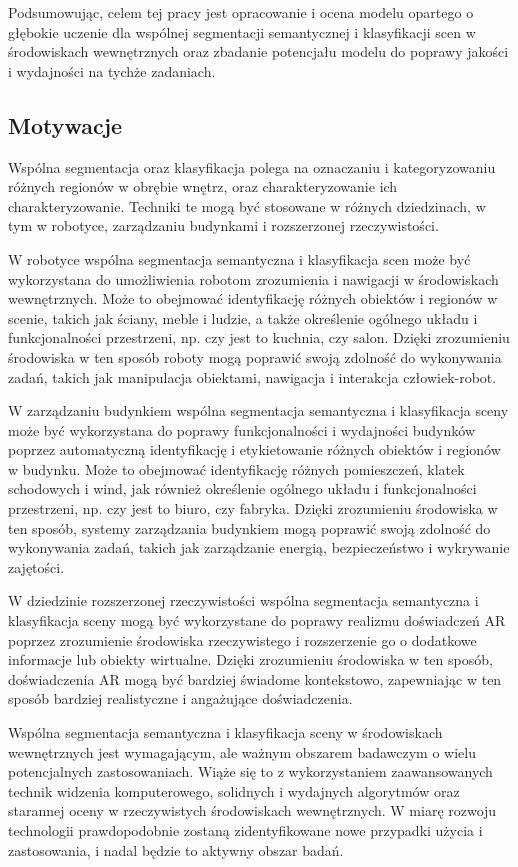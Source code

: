 Podsumowując, celem tej pracy jest opracowanie i ocena modelu opartego o głębokie uczenie dla wspólnej segmentacji semantycznej i klasyfikacji scen w środowiskach wewnętrznych oraz zbadanie potencjału modelu do poprawy jakości i wydajności na tychże zadaniach.

\subsection{Motywacje}
Wspólna segmentacja oraz klasyfikacja polega na oznaczaniu i kategoryzowaniu różnych regionów w obrębie wnętrz, oraz charakteryzowanie ich charakteryzowanie. Techniki te mogą być stosowane w różnych dziedzinach, w tym w robotyce, zarządzaniu budynkami i rozszerzonej rzeczywistości.

W robotyce wspólna segmentacja semantyczna i klasyfikacja scen może być wykorzystana do umożliwienia robotom zrozumienia i nawigacji w środowiskach wewnętrznych. Może to obejmować identyfikację różnych obiektów i regionów w scenie, takich jak ściany, meble i ludzie, a także określenie ogólnego układu i funkcjonalności przestrzeni, np. czy jest to kuchnia, czy salon. Dzięki zrozumieniu środowiska w ten sposób roboty mogą poprawić swoją zdolność do wykonywania zadań, takich jak manipulacja obiektami, nawigacja i interakcja człowiek-robot.

W zarządzaniu budynkiem wspólna segmentacja semantyczna i klasyfikacja sceny może być wykorzystana do poprawy funkcjonalności i wydajności budynków poprzez automatyczną identyfikację i etykietowanie różnych obiektów i regionów w budynku. Może to obejmować identyfikację różnych pomieszczeń, klatek schodowych i wind, jak również określenie ogólnego układu i funkcjonalności przestrzeni, np. czy jest to biuro, czy fabryka. Dzięki zrozumieniu środowiska w ten sposób, systemy zarządzania budynkiem mogą poprawić swoją zdolność do wykonywania zadań, takich jak zarządzanie energią, bezpieczeństwo i wykrywanie zajętości.

W dziedzinie rozszerzonej rzeczywistości wspólna segmentacja semantyczna i klasyfikacja sceny mogą być wykorzystane do poprawy realizmu doświadczeń AR poprzez zrozumienie środowiska rzeczywistego i rozszerzenie go o dodatkowe informacje lub obiekty wirtualne. Dzięki zrozumieniu środowiska w ten sposób, doświadczenia AR mogą być bardziej świadome kontekstowo, zapewniając w ten sposób bardziej realistyczne i angażujące doświadczenia.

Wspólna segmentacja semantyczna i klasyfikacja sceny w środowiskach wewnętrznych jest wymagającym, ale ważnym obszarem badawczym o wielu potencjalnych zastosowaniach. Wiąże się to z wykorzystaniem zaawansowanych technik widzenia komputerowego, solidnych i wydajnych algorytmów oraz starannej oceny w rzeczywistych środowiskach wewnętrznych. W miarę rozwoju technologii prawdopodobnie zostaną zidentyfikowane nowe przypadki użycia i zastosowania, i nadal będzie to aktywny obszar badań.
